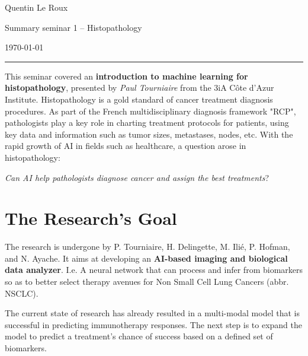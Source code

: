\documentclass[a4paper, 10pt]{article}
\begin{document}

\fancyhead[C]{}
\begin{minipage}{0.24\textwidth} 
\raggedright
\footnotesize
Quentin Le Roux \hfill
\end{minipage}
\begin{minipage}{0.5\textwidth} 
\centering 
\begin{center}
    Summary seminar 1 -- Histopathology
\end{center}
\end{minipage}
\begin{minipage}{0.245\textwidth} 
\raggedleft
\today
\end{minipage}
\hrule 
\bigskip


This seminar covered an \textbf{introduction to machine learning for histopathology}, presented by \textit{Paul Tourniaire} from the 3iA Côte d'Azur Institute. 
\newline\newline
Histopathology is a gold standard of cancer treatment diagnosis procedures. As part of the French multidisciplinary diagnosis framework "RCP", pathologists play a key role in charting treatment protocols for patients, using key data and information such as tumor sizes, metastases, nodes, etc. With the rapid growth of AI in fields such as healthcare, a question arose in histopathology:

\begin{center}
\textit{Can AI help pathologists diagnose cancer and assign the best treatments}?
\end{center}

\section{The Research's Goal}
The research is undergone by P. Tourniaire, H. Delingette, M. Ilié, P. Hofman, and N. Ayache. It aims at developing an \textbf{AI-based imaging and biological data analyzer}. I.e. A neural network that can process and infer from biomarkers so as to better select therapy avenues for Non Small Cell Lung Cancers (abbr. NSCLC). 

The current state of research has already resulted in a multi-modal model that is successful in predicting immunotherapy responses. The next step is to expand the model to predict a treatment's chance of success based on a defined set of biomarkers.
\end{document}
